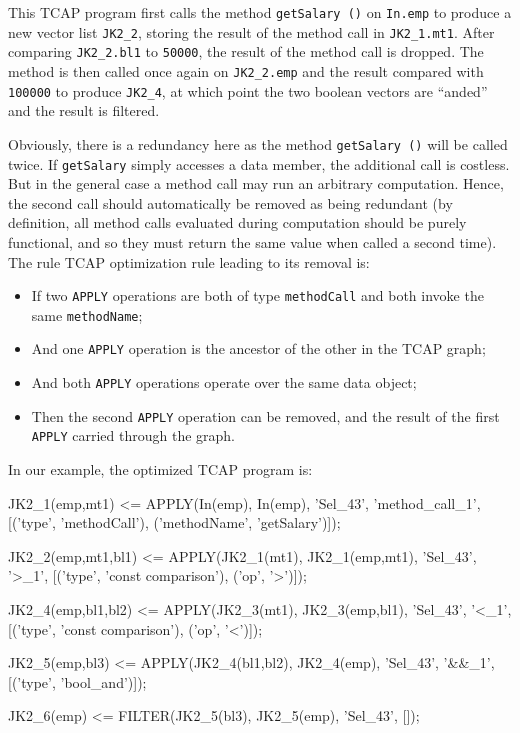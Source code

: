 \noindent
This TCAP program first calls the method \texttt{getSalary ()} on \texttt{In.emp} to produce a new vector list \texttt{JK2\_2}, storing the result
of the method call in \texttt{JK2\_1.mt1}.  After comparing \texttt{JK2\_2.bl1} to \texttt{50000}, the result of the method call is dropped.
The method is then called once again on \texttt{JK2\_2.emp} and the result compared with \texttt{100000} to produce \texttt{JK2\_4}, at which 
point the two boolean vectors are ``anded'' and the result is filtered.

Obviously, there is a redundancy here as the method \texttt{getSalary ()} will be called twice.
If \texttt{getSalary} simply accesses a data member, the additional call is costless.  But in the general case a method call may run an arbitrary
computation.  Hence, the second call should automatically be removed as being redundant 
(by definition, all method calls evaluated during computation should
be purely functional, and so they must return the same value when called a second time).
The rule TCAP optimization rule leading to its removal is:

\begin{itemize}
\vspace{-5 pt}
\item If two \texttt{APPLY} operations are both of type \texttt{methodCall} and both invoke the same \texttt{methodName};
\vspace{-5 pt}
\item And one \texttt{APPLY} operation is the ancestor of the other in the TCAP graph;
\vspace{-5 pt}
\item And both \texttt{APPLY} operations operate over the same data object;
\vspace{-5 pt}
\item Then the second \texttt{APPLY} operation can be removed, and the result of the first \texttt{APPLY} carried through the graph.
\end{itemize}

\noindent
In our example, the
optimized
TCAP program is:

\begin{codesmall}
JK2_1(emp,mt1) <= APPLY(In(emp), In(emp), 'Sel_43', 'method_call_1',
   [('type', 'methodCall'), ('methodName', 'getSalary')]);

JK2_2(emp,mt1,bl1) <= APPLY(JK2_1(mt1), JK2_1(emp,mt1), 'Sel_43', '>_1', 
  [('type', 'const comparison'), ('op', '>')]);

JK2_4(emp,bl1,bl2) <= APPLY(JK2_3(mt1), JK2_3(emp,bl1), 'Sel_43', '<_1', 
  [('type', 'const comparison'), ('op', '<')]);

JK2_5(emp,bl3) <= APPLY(JK2_4(bl1,bl2), JK2_4(emp), 'Sel_43', '&&_1', 
  [('type', 'bool_and')]);

JK2_6(emp) <= FILTER(JK2_5(bl3), JK2_5(emp), 'Sel_43’, []);
  
\end{codesmall}

